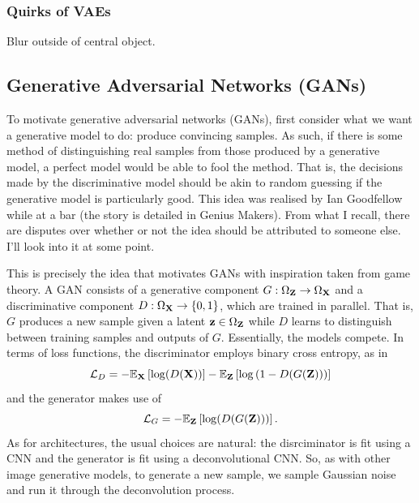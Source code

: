 \documentclass[11pt]{article}
\begin{document}

\subsubsection{\TODO Quirks of VAEs}
Blur outside of central object.

\subsection{\IMPROVE Generative Adversarial Networks (GANs)}
To motivate generative adversarial networks (GANs), first consider what we want a generative model to do: produce convincing samples. As such, if there is some method of distinguishing real samples from those produced by a generative model, a perfect model would be able to fool the method. That is, the decisions made by the discriminative model should be akin to random guessing if the generative model is particularly good. This idea was realised by Ian Goodfellow while at a bar (the story is detailed in Genius Makers). From what I recall, there are disputes over whether or not the idea should be attributed to someone else. I'll look into it at some point.

This is precisely the idea that motivates GANs with inspiration taken from game theory. A GAN consists of a generative component $G:\Omega_{\mathbf{Z}}\to\Omega_{\mathbf{X}}$ and a discriminative component $D:\Omega_{\mathbf{X}}\to\{0,1\}$, which are trained in parallel. That is, $G$ produces a new sample given a latent $\mathbf{z}\in\Omega_{\mathbf{Z}}$ while $D$ learns to distinguish between training samples and outputs of $G$. Essentially, the models compete. In terms of loss functions, the discriminator employs binary cross entropy, as in
$$
\mathcal{L}_D
=
-\mathbb{E}_{\mathbf{X}}\left[\log(D(\mathbf{X}))\right]-\mathbb{E}_{\mathbf{Z}}\left[\log\left(1-D(G(\mathbf{Z}))\right)\right]
$$
and the generator makes use of
$$
\mathcal{L}_G
=
-\mathbb{E}_{\mathbf{Z}}\left[\log(D(G(\mathbf{Z})))\right].
$$
As for architectures, the usual choices are natural: the disrciminator is fit using a CNN and the generator is fit using a deconvolutional CNN. So, as with other image generative models, to generate a new sample, we sample Gaussian noise and run it through the deconvolution process.
\end{document}
